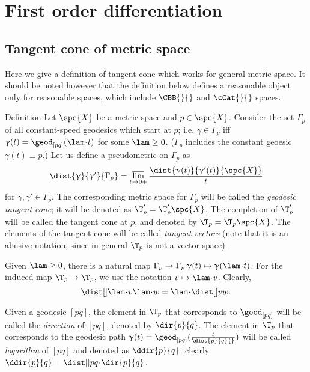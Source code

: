 \chapter{First order differentiation}\label{chap:tan}

\section{Tangent cone of metric space}\label{sec:tan}

Here we give a definition of tangent cone which works for general metric space.
It should be noted however that the definition below defines a reasonable object only for reasonable spaces, which include $\CBB{}{}$ and $\cCat{}{}$ spaces.

\begin{thm}{Definition}\label{def:tan}
Let $\spc{X}$ be a metric space and $p\in\spc{X}$.
Consider the set $\Gamma_p$ of all constant-speed geodesics which start at $p$;
i.e. $\gamma\in\Gamma_p$ iff $\gamma(t)=\geod_{[pq]}(\lam\cdot t)$ for some $\lam\ge0$.
($\Gamma_p$ includes the constant geoesic $\gamma(t)\equiv p$.)
Let us define a pseudometric on $\Gamma_p$ as
\[\dist{\gamma}{\gamma'}{\Gamma_p}
=
\limsup_{t\to0+}\frac{\dist{\gamma(t)}{\gamma'(t)}{\spc{X}}}{t}\]
for $\gamma,\gamma'\in\Gamma_p$.
The corresponding metric space  for $\Gamma_p$ will be called the \emph{geodesic tangent cone}; 
it will be denoted as $\T_p'=\T_p'\spc{X}$.
The completion of $\T_p'$ will be called the tangent cone at $p$, and denoted by $\T_p=\T_p\spc{X}$.
The elements of the  tangent cone will be called \emph{tangent vectors}
(note that it is an abusive notation, since in general $\T_p$ is not a vector space).
\end{thm}

Given $\lam\ge0$, there is a natural map $\Gamma_p\to\Gamma_p\:\gamma(t)\mapsto\gamma(\lam\cdot t)$.
For the induced map $\T_p\to\T_p$, we use the notation $v\mapsto \lam\cdot v$.
Clearly, 
\[\dist[{{}}]{\lam\cdot v}{\lam\cdot w}{}=\lam\cdot\dist[{{}}]{v}{w}{}.\]

Given a geodesic $[p q]$, 
the element in $\T_p$ that corresponds to $\geod_{[p q]}$ 
will be called the \emph{direction} of $[p q]$, denoted by $\dir{p}{q}$\index{$\dir{*}{*}$}.
The element in $\T_p$ that corresponds to the geodesic path $\gamma(t)=\geod_{[p q]}(\tfrac{t}{\dist{p}{q}{}})$ 
will be called \emph{logarithm} of $[p q]$ and denoted as $\ddir{p}{q}$\index{$\dir{*}{*}$};
clearly $\ddir{p}{q}=\dist[{{}}]{p}{q}{}\cdot\dir{p}{q}$.

